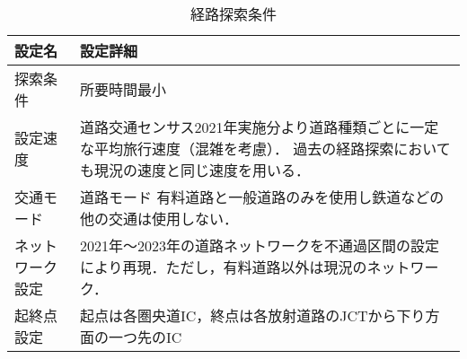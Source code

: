 \begin{table}[h!]
  \centering
  \renewcommand{\arraystretch}{1.2} %
  \begin{tabularx}{\textwidth}{p{}   X}
  \toprule
  \textbf{設定名}     &\textbf{設定詳細}                                 \\
  \midrule
  探索条件            & 所要時間最小                                  \\
  設定速度            & 道路交通センサス2021年実施分より道路種類ごとに一定な平均旅行速度（混雑を考慮）．\cite{kokudo2021} 過去の経路探索においても現況の速度と同じ速度を用いる．           \\
  交通モード            & 道路モード 有料道路と一般道路のみを使用し鉄道などの他の交通は使用しない．                                  \\
  ネットワーク設定          & 2021年〜2023年の道路ネットワークを不通過区間の設定により再現．ただし，有料道路以外は現況のネットワーク．                                  \\
  起終点設定            & 起点は各圏央道IC，終点は各放射道路のJCTから下り方面の一つ先のIC                               \\
  \bottomrule
  \end{tabularx}
  \caption{経路探索条件}
  \label{conditions of search}
  \end{table}
  

